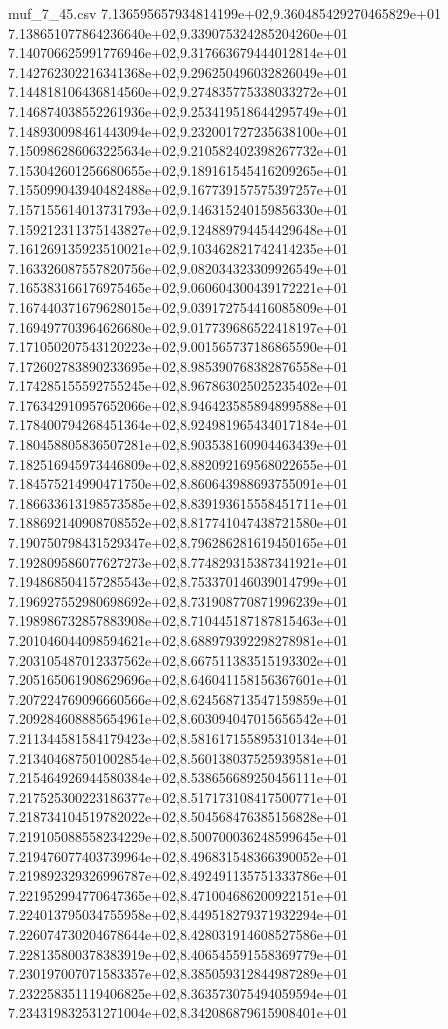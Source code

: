 \begin{filecontents*}{muf_7_45.csv}
7.136595657934814199e+02,9.360485429270465829e+01
7.138651077864236640e+02,9.339075324285204260e+01
7.140706625991776946e+02,9.317663679444012814e+01
7.142762302216341368e+02,9.296250496032826049e+01
7.144818106436814560e+02,9.274835775338033272e+01
7.146874038552261936e+02,9.253419518644295749e+01
7.148930098461443094e+02,9.232001727235638100e+01
7.150986286063225634e+02,9.210582402398267732e+01
7.153042601256680655e+02,9.189161545416209265e+01
7.155099043940482488e+02,9.167739157575397257e+01
7.157155614013731793e+02,9.146315240159856330e+01
7.159212311375143827e+02,9.124889794454429648e+01
7.161269135923510021e+02,9.103462821742414235e+01
7.163326087557820756e+02,9.082034323309926549e+01
7.165383166176975465e+02,9.060604300439172221e+01
7.167440371679628015e+02,9.039172754416085809e+01
7.169497703964626680e+02,9.017739686522418197e+01
7.171050207543120223e+02,9.001565737186865590e+01
7.172602783890233695e+02,8.985390768382876558e+01
7.174285155592755245e+02,8.967863025025235402e+01
7.176342910957652066e+02,8.946423585894899588e+01
7.178400794268451364e+02,8.924981965434017184e+01
7.180458805836507281e+02,8.903538160904463439e+01
7.182516945973446809e+02,8.882092169568022655e+01
7.184575214990471750e+02,8.860643988693755091e+01
7.186633613198573585e+02,8.839193615558451711e+01
7.188692140908708552e+02,8.817741047438721580e+01
7.190750798431529347e+02,8.796286281619450165e+01
7.192809586077627273e+02,8.774829315387341921e+01
7.194868504157285543e+02,8.753370146039014799e+01
7.196927552980698692e+02,8.731908770871996239e+01
7.198986732857883908e+02,8.710445187187815463e+01
7.201046044098594621e+02,8.688979392298278981e+01
7.203105487012337562e+02,8.667511383515193302e+01
7.205165061908629696e+02,8.646041158156367601e+01
7.207224769096660566e+02,8.624568713547159859e+01
7.209284608885654961e+02,8.603094047015656542e+01
7.211344581584179423e+02,8.581617155895310134e+01
7.213404687501002854e+02,8.560138037525939581e+01
7.215464926944580384e+02,8.538656689250456111e+01
7.217525300223186377e+02,8.517173108417500771e+01
7.218734104519782022e+02,8.504568476385156828e+01
7.219105088558234229e+02,8.500700036248599645e+01
7.219476077403739964e+02,8.496831548366390052e+01
7.219892329326996787e+02,8.492491135751333786e+01
7.221952994770647365e+02,8.471004686200922151e+01
7.224013795034755958e+02,8.449518279371932294e+01
7.226074730204678644e+02,8.428031914608527586e+01
7.228135800378383919e+02,8.406545591558369779e+01
7.230197007071583357e+02,8.385059312844987289e+01
7.232258351119406825e+02,8.363573075494059594e+01
7.234319832531271004e+02,8.342086879615908401e+01

\end{filecontents*}
